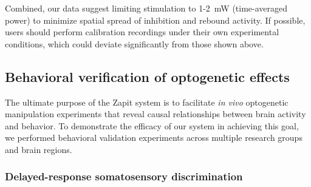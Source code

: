 \documentclass[9pt,lineno]{elife}
\begin{document}
Combined, our data suggest limiting stimulation to 1-2~mW (time-averaged power) to minimize spatial spread of inhibition and rebound activity.
If possible, users should perform calibration recordings under their own experimental conditions, which could deviate significantly from those shown above.

\subsection{Behavioral verification of optogenetic effects}

The ultimate purpose of the Zapit system is to facilitate \textit{in vivo} optogenetic manipulation experiments that reveal causal relationships between brain activity and behavior.
To demonstrate the efficacy of our system in achieving this goal, we performed behavioral validation experiments across multiple research groups and brain regions.

\subsubsection{Delayed-response somatosensory discrimination}
\end{document}
